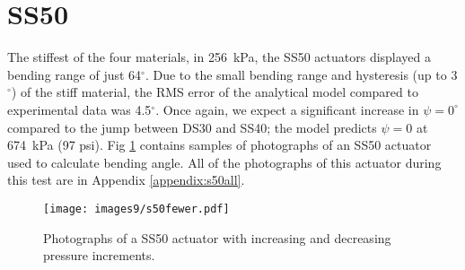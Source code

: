 \clearpage
\section{SS50}

The stiffest of the four materials, in 256~kPa, the SS50 actuators displayed a bending range of just 64$^\circ$. Due to the small bending range and hysteresis (up to 3$^\circ$) of the stiff material, the RMS error of the analytical model compared to experimental data was 4.5$^\circ$. Once again, we expect a significant increase in $\psi=0^\circ$ compared to the jump between DS30 and SS40; the model predicts $\psi=0$ at 674~kPa (97 psi). Fig \ref{fig:s50fewer} contains samples of photographs of an SS50 actuator used to calculate bending angle. All of the photographs of this actuator during this test are in Appendix \ref{appendix:s50all}. 
\\
\begin{figure}[ht]
    \centering
     \texttt{[image: images9/s50fewer.pdf]}
    \caption{Photographs of a SS50 actuator with increasing and decreasing pressure increments.}
    \label{fig:s50fewer}
\end{figure}

